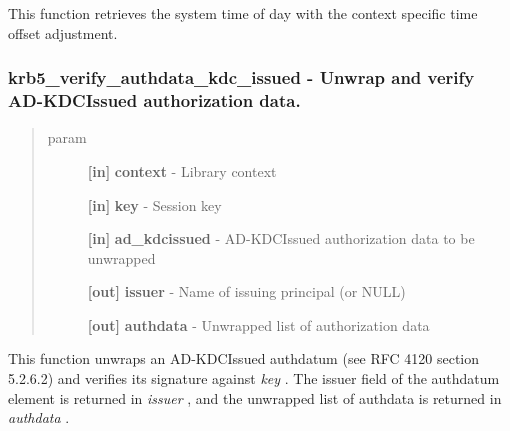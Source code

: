 \documentclass[letterpaper,10pt,english]{sphinxmanual}
\begin{document}
This function retrieves the system time of day with the context specific time offset adjustment.


\subsubsection{krb5\_verify\_authdata\_kdc\_issued -  Unwrap and verify AD-KDCIssued authorization data.}
\label{appdev/refs/api/krb5_verify_authdata_kdc_issued:krb5-verify-authdata-kdc-issued-unwrap-and-verify-ad-kdcissued-authorization-data}\label{appdev/refs/api/krb5_verify_authdata_kdc_issued::doc}

\begin{fulllineitems}
\label{appdev/refs/api/krb5_verify_authdata_kdc_issued:krb5_verify_authdata_kdc_issued}
\end{fulllineitems}

\begin{quote}\begin{description}
\item[{param}] \leavevmode
\textbf{{[}in{]}} \textbf{context} - Library context

\textbf{{[}in{]}} \textbf{key} - Session key

\textbf{{[}in{]}} \textbf{ad\_kdcissued} - AD-KDCIssued authorization data to be unwrapped

\textbf{{[}out{]}} \textbf{issuer} - Name of issuing principal (or NULL)

\textbf{{[}out{]}} \textbf{authdata} - Unwrapped list of authorization data

\end{description}\end{quote}

This function unwraps an AD-KDCIssued authdatum (see RFC 4120 section 5.2.6.2) and verifies its signature against \emph{key} . The issuer field of the authdatum element is returned in \emph{issuer} , and the unwrapped list of authdata is returned in \emph{authdata} .
\end{document}
